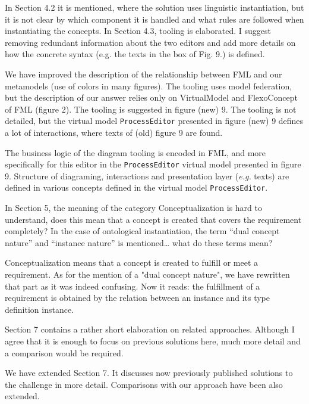 \documentclass[10pt]{article}
\begin{document}
\begin{response}{In Section 4.2 it is mentioned, where the solution uses linguistic instantiation, but it is not clear by which component it is handled and what rules are followed when instantiating the concepts. In Section 4.3, tooling is elaborated. I suggest removing redundant information about the two editors and add more details on how the concrete syntax (e.g. the texts in the box of Fig. 9.) is defined.}

We have improved the description of the relationship between FML and our metamodels (use of colors in many figures).
The tooling uses model federation, but the description of our answer relies only on \textsf{VirtualModel} and \textsf{FlexoConcept} of FML (figure 2). The tooling is suggested in figure (new) 9. The tooling is not detailed, but the virtual model \texttt{ProcessEditor} presented in figure (new) 9 defines a lot of interactions, where texts of (old) figure 9 are found.

The business logic of the diagram tooling is encoded in FML, and more specifically for this editor in the \texttt{ProcessEditor} virtual model presented in figure 9. Structure of diagraming, interactions and presentation layer (\emph{e.g.} texts) are defined in various concepts defined in the virtual model \texttt{ProcessEditor}.
\end{response}

\begin{response}{In Section 5, the meaning of the category Conceptualization is hard to understand, does this mean that a concept is created that covers the requirement completely? In the case of ontological instantiation, the term “dual concept nature” and “instance nature” is mentioned… what do these terms mean?}


Conceptualization means that a concept is created to fulfill or meet a requirement. As for the mention of a "dual concept nature", we have rewritten that part as it was indeed confusing. Now it reads: the fulfillment of a requirement is obtained by the relation between an instance and its type definition instance.%

\end{response}

\begin{response}{Section 7 contains a rather short elaboration on related approaches. Although I agree that it is enough to focus on previous solutions here, much more detail and a comparison would be required.}

We have extended Section 7. It discusses now previously published solutions to the challenge in more detail. Comparisons with our approach have been also extended.

\end{response}
\end{document}
